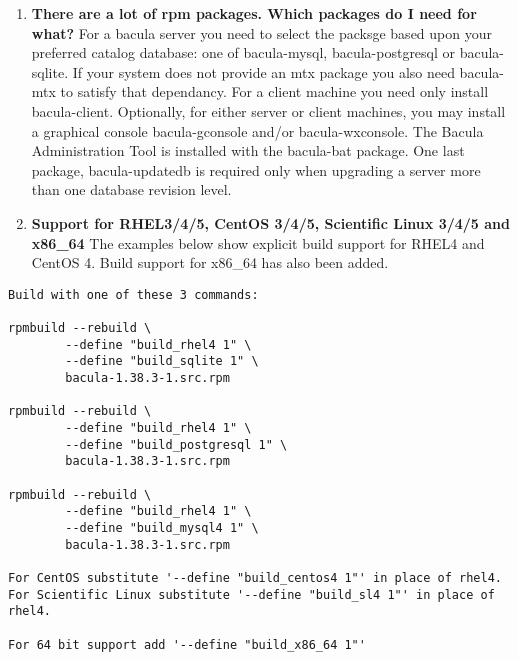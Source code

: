\begin{enumerate}
\footnotesize
\begin{verbatim}
        chown bacula.bacula /var/bacula/*
        chown root.bacula /var/bacula/bacula-fd.9102.state
        chown bacula.disk /var/bacula/bacula-sd.9103.state

\end{verbatim}
\normalsize

Further, if you are using File storage volumes rather than tapes those
files will also need to have ownership set to user bacula and group bacula.

\item
   \label{faq9}
   {\bf There are a lot of rpm packages.  Which packages do I need for
what?} For a bacula server you need to select the packsge based upon your
preferred catalog database: one of bacula-mysql, bacula-postgresql or
bacula-sqlite.  If your system does not provide an mtx package you also
need bacula-mtx to satisfy that dependancy.  For a client machine you need
only install bacula-client.  Optionally, for either server or client
machines, you may install a graphical console bacula-gconsole and/or
bacula-wxconsole. The Bacula Administration Tool is installed with the
bacula-bat package.  One last package, bacula-updatedb is required only when
upgrading a server more than one database revision level.



\item {\bf Support for RHEL3/4/5, CentOS 3/4/5, Scientific Linux 3/4/5 and x86\_64}
   The examples below show
   explicit build support for RHEL4 and CentOS 4. Build support
   for x86\_64 has also been added.
\end{enumerate}

\footnotesize
\begin{verbatim}
Build with one of these 3 commands:

rpmbuild --rebuild \
        --define "build_rhel4 1" \
        --define "build_sqlite 1" \
        bacula-1.38.3-1.src.rpm

rpmbuild --rebuild \
        --define "build_rhel4 1" \
        --define "build_postgresql 1" \
        bacula-1.38.3-1.src.rpm

rpmbuild --rebuild \
        --define "build_rhel4 1" \
        --define "build_mysql4 1" \
        bacula-1.38.3-1.src.rpm

For CentOS substitute '--define "build_centos4 1"' in place of rhel4.
For Scientific Linux substitute '--define "build_sl4 1"' in place of rhel4.

For 64 bit support add '--define "build_x86_64 1"'
\end{verbatim}
\normalsize

